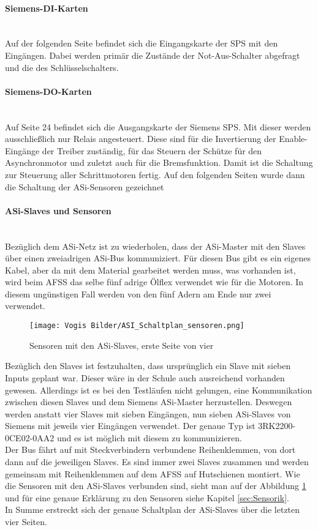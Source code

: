     \paragraph{Siemens-DI-Karten}\mbox{}\\
    Auf der folgenden Seite befindet sich die Eingangskarte der SPS mit den Eingängen. Dabei werden primär die Zustände der Not-Aus-Schalter abgefragt und die des Schlüsselschalters.
    \paragraph{Siemens-DO-Karten}\mbox{}\\
    Auf Seite 24 befindet sich die Ausgangskarte der Siemens SPS. Mit dieser werden ausschließlich nur Relais angesteuert. Diese sind für die Invertierung der Enable-Eingänge der Treiber zuständig, für das Steuern der Schütze für den Asynchronmotor und zuletzt auch für die Bremsfunktion. Damit ist die Schaltung zur Steuerung aller Schrittmotoren fertig. Auf den folgenden Seiten wurde dann die Schaltung der ASi-Sensoren gezeichnet
    \paragraph{ASi-Slaves und Sensoren}\mbox{}\\
    Bezüglich dem ASi-Netz ist zu wiederholen, dass der ASi-Master mit den Slaves über einen zweiadrigen ASi-Bus kommuniziert. Für diesen Bus gibt es ein eigenes Kabel, aber da mit dem Material gearbeitet werden muss, was vorhanden ist, wird beim AFSS das selbe fünf adrige Ölflex verwendet wie für die Motoren. In diesem ungünstigen Fall werden von den fünf Adern am Ende nur zwei verwendet.\\
    \begin{figure}[H]
        \centering
        \texttt{[image: Vogis Bilder/ASI\_Schaltplan\_sensoren.png]}
        \caption{Sensoren mit den ASi-Slaves, erste Seite von vier}
        \label{fig:ASI_Sensoren}
    \end{figure}
    Bezüglich den Slaves ist festzuhalten, dass ursprünglich ein Slave mit sieben Inputs geplant war. Dieser wäre in der Schule auch ausreichend vorhanden gewesen. Allerdings ist es bei den Testläufen nicht gelungen, eine Kommunikation zwischen diesen Slaves und dem Siemens ASi-Master herzustellen. Deswegen werden anstatt vier Slaves mit sieben Eingängen, nun sieben ASi-Slaves von Siemens mit jeweils vier Eingängen verwendet. Der genaue Typ ist 3RK2200-0CE02-0AA2 und es ist möglich mit diesem zu kommunizieren.\\
    Der Bus fährt auf mit Steckverbindern verbundene Reihenklemmen, von dort dann auf die jeweiligen Slaves. Es sind immer zwei Slaves zusammen und werden gemeinsam mit Reihenklemmen auf dem AFSS auf Hutschienen montiert. Wie die Sensoren mit den ASi-Slaves verbunden sind, sieht man auf der Abbildung \ref{fig:ASI_Sensoren} und für eine genaue Erklärung zu den Sensoren siehe Kapitel \ref{sec:Sensorik}.\\
    In Summe erstreckt sich der genaue Schaltplan der ASi-Slaves über die letzten vier Seiten.
